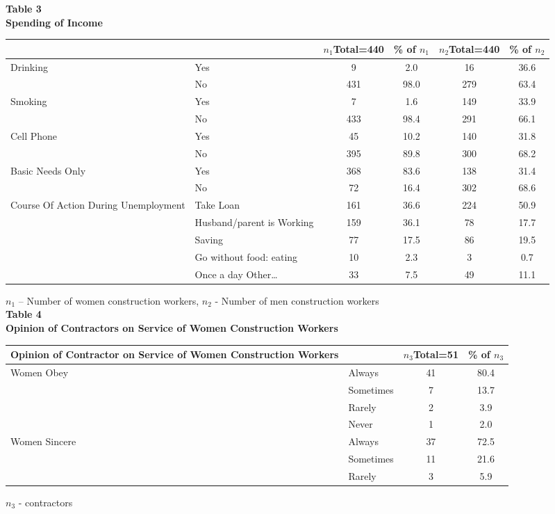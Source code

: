 \documentclass[12pt]{report}
\newcommand{\bt}[1]{\textbf{#1}}
\newcommand{\NI}{\noindent}
\begin{document}
	\NI\bt{Table 3}\\
	\bt{Spending of Income}
	\begin{longtable}{p{}p{}@{\hskip 0.2in}c@{\hskip 0.2in}c@{\hskip 0.2in}c@{\hskip 0.2in}c}
		\hline
		 & &$n_1${\footnotesize Total=440} & {\footnotesize\% of }$n_1$   &    $n_2${\footnotesize Total=440}  & {\footnotesize\% of }$n_2$  \\ \hline
		\multirow{2}{=}{Drinking}  & Yes & 9 & 2.0 & 16 & 36.6 \\
								& No & 431 & 98.0 & 279 & 63.4 \\ \hline 
		\multirow{2}{=}{Smoking}  &  Yes & 7 & 1.6 &  149 & 33.9 \\
		& No & 433 & 98.4 & 291 & 66.1 \\ \hline 
		\multirow{2}{=}{Cell Phone}  &  Yes &  45 & 10.2 & 140 & 31.8 \\
		& No &  395 & 89.8 & 300 & 68.2 \\ \hline 
		\multirow{2}{=}{Basic Needs Only}  & Yes & 368 &  83.6  &  138 & 31.4 \\
		& No & 72 & 16.4 & 302 & 68.6 \\ \hline
		\multirow{5}{=}{Course  Of Action During Unemployment} &  Take Loan &  161  & 36.6 & 224 & 50.9\\ \cline{2-6}
		 			& Husband/parent is Working & 159  & 36.1  & 78 & 17.7 \\ \cline{2-6}
		 			& Saving & 77 & 17.5 & 86 & 19.5 \\ \cline{2-6}
					& Go without food: eating & 10 & 2.3 & 3 &  0.7\\ \cline{2-6}
					& Once a day Other\ldots & 33 & 7.5 & 49 & 11.1 \\ \hline
	\end{longtable}
     $n_1$ – Number of women construction workers, $n_2$ - Number of men construction workers\\
	
	\NI\bt{Table 4}\\
	\bt{Opinion of Contractors on Service of Women Construction Workers}
	\begin{longtable}{p{}p{}@{\hskip 0.2in}c@{\hskip 0.2in}c}
		\hline
		\bt{Opinion of Contractor on Service of Women Construction Workers} & & $n_3${\footnotesize Total=51} & {\footnotesize\% of }$n_3$\\ \hline
		\multirow{4}{=}{Women Obey} & Always & 41 & 80.4 \\
									& Sometimes & 7 & 13.7 \\
									& Rarely & 2 & 3.9 \\
									& Never & 1 & 2.0 \\ \hline
		\multirow{3}{=}{Women Sincere} & Always & 37 & 72.5 \\
		& Sometimes &  11  & 21.6 \\
		& Rarely & 3 & 5.9 \\ \hline
	\end{longtable}
	$n_3$ - contractors\\
	
\end{document}
